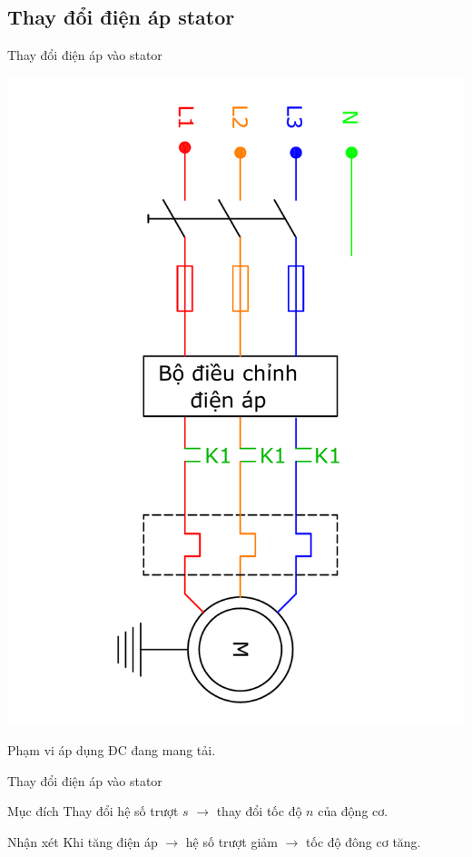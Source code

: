\documentclass[20pt]{beamer}
\begin{document}
\subsection*{Thay đổi điện áp stator}
\begin{frame}{Thay đổi điện áp vào stator}
	\vspace{-3.3cm}
	\begin{center}
		\includegraphics[scale=0.4, angle = 90]{../sodomach/dieu-chinh-dien-ap-stator.pdf}
	\end{center}
	\vspace{-3cm}
	\begin{block}{Phạm vi áp dụng}
		ĐC đang mang tải.
	\end{block}
\end{frame}

\begin{frame}{Thay đổi điện áp vào stator}
	\begin{block}{Mục đích}
		\justifying
		Thay đổi \textcolor{doden}{hệ số trượt $s$} $\longrightarrow$ thay đổi \textcolor{doden}{tốc độ $n$ của động cơ}.
   \end{block}
   
   \begin{block}{Nhận xét}
   		\justifying
		Khi \textcolor{doden}{tăng điện áp} $\longrightarrow$ \textcolor{doden}{hệ số trượt giảm} $\longrightarrow$ \textcolor{doden}{tốc độ đông cơ tăng}.
   \end{block}
\end{frame}
\end{document}
